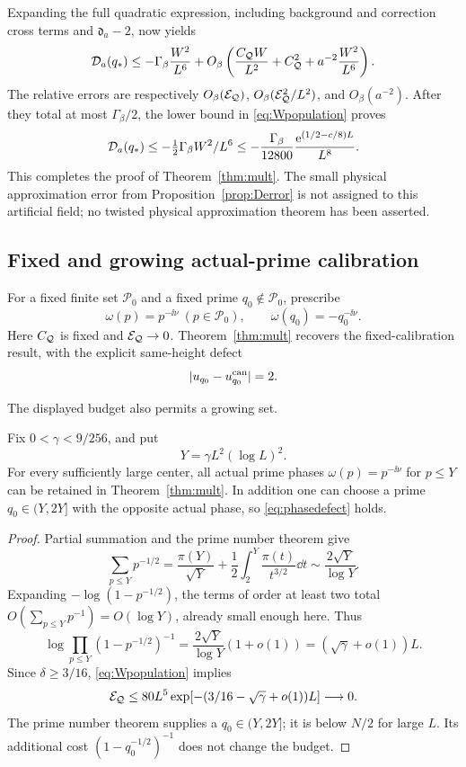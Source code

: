 Expanding the full quadratic expression, including background and
correction cross terms and \(\mathfrak d_a-2\), now yields
\begin{equation}\label{eq:fullprimeerror}
 \mathcal D_a(q_*)\le-\Gamma_\beta\frac{W^2}{L^6}
 +O_\beta\left(\frac{C_{\mathcal Q}W}{L^2}+C_{\mathcal Q}^2
                         +a^{-2}\frac{W^2}{L^6}\right).
\end{equation}
The relative errors are respectively
\(O_\beta(\mathcal E_{\mathcal Q})\),
\(O_\beta(\mathcal E_{\mathcal Q}^2/L^2)\), and \(O_\beta(a^{-2})\).
After they total at most \(\Gamma_\beta/2\), the lower bound in
\eqref{eq:Wpopulation} proves
\[
 \mathcal D_a(q_*)\le-\tfrac12\Gamma_\beta W^2/L^6
 \le-\frac{\Gamma_\beta}{12800}
                         \frac{\mathrm e^{(1/2-c/8)L}}{L^8}.
\]
This completes the proof of Theorem~\ref{thm:mult}.
The small physical approximation error from
Proposition~\ref{prop:Derror} is not assigned to this artificial field;
no twisted physical approximation theorem has been asserted.

\subsection{Fixed and growing actual-prime calibration}

For a fixed finite set \(\mathcal P_0\) and a fixed prime
\(q_0\notin\mathcal P_0\), prescribe
\[
 \omega(p)=p^{-\ii\nu}\ (p\in\mathcal P_0),\qquad
 \omega(q_0)=-q_0^{-\ii\nu}.
\]
Here \(C_{\mathcal Q}\) is fixed and \(\mathcal E_{\mathcal Q}\to0\).
Theorem~\ref{thm:mult} recovers the fixed-calibration result, with the
explicit same-height defect
\begin{equation}\label{eq:phasedefect}
 |u_{q_0}-u_{q_0}^{\mathrm{can}}|=2.
\end{equation}

The displayed budget also permits a growing set.
\begin{corollary}\label{cor:growing}
Fix \(0<\gamma<9/256\), and put
\begin{equation}\label{eq:Y}
 Y=\gamma L^2(\log L)^2.
\end{equation}
For every sufficiently large center, all actual prime phases
\(\omega(p)=p^{-\ii\nu}\) for \(p\le Y\) can be retained in
Theorem~\ref{thm:mult}. In addition one can choose a prime
\(q_0\in(Y,2Y]\) with the opposite actual phase, so
\eqref{eq:phasedefect} holds.
\end{corollary}
\begin{proof}
Partial summation and the prime number theorem give
\[
 \sum_{p\le Y}p^{-1/2}
 =\frac{\pi(Y)}{\sqrt Y}
       +\frac12\int_2^Y\frac{\pi(t)}{t^{3/2}}\dd t
 \sim\frac{2\sqrt Y}{\log Y}.
\]
Expanding \(-\log(1-p^{-1/2})\), the terms of order at least two
total \(O(\sum_{p\le Y}p^{-1})=O(\log Y)\), already small enough here.
Thus
\[
 \log\prod_{p\le Y}(1-p^{-1/2})^{-1}
 =\frac{2\sqrt Y}{\log Y}(1+o(1))
 =(\sqrt\gamma+o(1))L.
\]
Since \(\delta\ge3/16\), \eqref{eq:Wpopulation} implies
\[
 \mathcal E_{\mathcal Q}\le80L^5
       \exp[-(3/16-\sqrt\gamma+o(1))L]\longrightarrow0.
\]
The prime number theorem supplies a \(q_0\in(Y,2Y]\); it is below
\(N/2\) for large \(L\). Its additional cost
\((1-q_0^{-1/2})^{-1}\) does not change the budget.
\end{proof}

